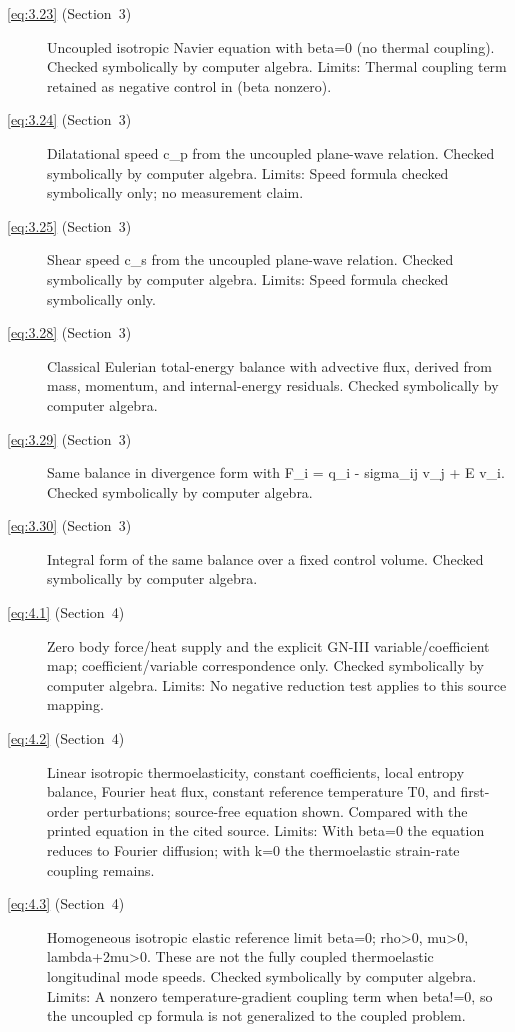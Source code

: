 \begin{description}

  \item[\eqref{eq:3.23} (Section~3)] Uncoupled isotropic Navier equation with beta=0 (no thermal coupling). Checked symbolically by computer algebra. Limits: Thermal coupling term retained as negative control in (beta nonzero).

  \item[\eqref{eq:3.24} (Section~3)] Dilatational speed c_p from the uncoupled plane-wave relation. Checked symbolically by computer algebra. Limits: Speed formula checked symbolically only; no measurement claim.

  \item[\eqref{eq:3.25} (Section~3)] Shear speed c_s from the uncoupled plane-wave relation. Checked symbolically by computer algebra. Limits: Speed formula checked symbolically only.

  \item[\eqref{eq:3.28} (Section~3)] Classical Eulerian total-energy balance with advective flux, derived from mass, momentum, and internal-energy residuals. Checked symbolically by computer algebra.

  \item[\eqref{eq:3.29} (Section~3)] Same balance in divergence form with F_i = q_i - sigma_ij v_j + E v_i. Checked symbolically by computer algebra.

  \item[\eqref{eq:3.30} (Section~3)] Integral form of the same balance over a fixed control volume. Checked symbolically by computer algebra.

  \item[\eqref{eq:4.1} (Section~4)] Zero body force/heat supply and the explicit GN-III variable/coefficient map; coefficient/variable correspondence only. Checked symbolically by computer algebra. Limits: No negative reduction test applies to this source mapping.

  \item[\eqref{eq:4.2} (Section~4)] Linear isotropic thermoelasticity, constant coefficients, local entropy balance, Fourier heat flux, constant reference temperature T0, and first-order perturbations; source-free equation shown. Compared with the printed equation in the cited source. Limits: With beta=0 the equation reduces to Fourier diffusion; with k=0 the thermoelastic strain-rate coupling remains.

  \item[\eqref{eq:4.3} (Section~4)] Homogeneous isotropic elastic reference limit beta=0; rho>0, mu>0, lambda+2mu>0. These are not the fully coupled thermoelastic longitudinal mode speeds. Checked symbolically by computer algebra. Limits: A nonzero temperature-gradient coupling term when beta!=0, so the uncoupled cp formula is not generalized to the coupled problem.


\end{description}
